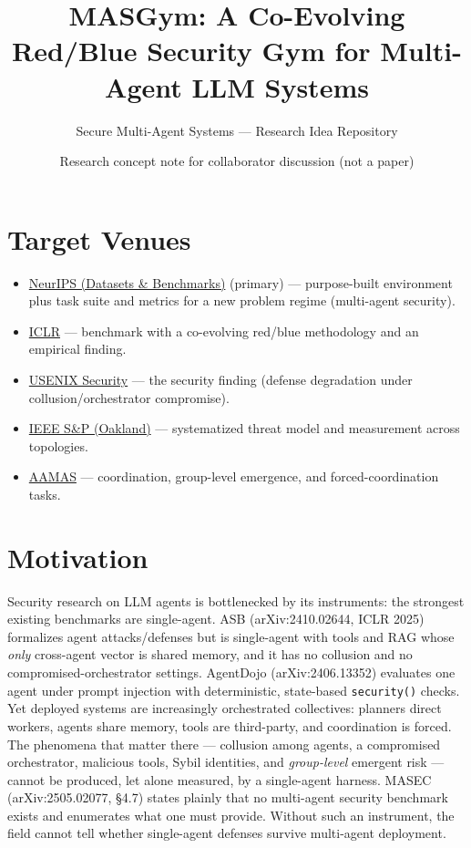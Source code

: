 \documentclass[11pt]{article}
\title{\bfseries MASGym: A Co-Evolving Red/Blue Security Gym for Multi-Agent LLM Systems}
\author{Secure Multi-Agent Systems --- Research Idea Repository}
\date{Research concept note for collaborator discussion (not a paper)}
\begin{document}
\maketitle

\section*{Target Venues}
\begin{itemize}
\item \href{https://neurips.cc/}{NeurIPS (Datasets \& Benchmarks)} (primary) --- purpose-built environment plus task suite and metrics for a new problem regime (multi-agent security).
\item \href{https://iclr.cc/}{ICLR} --- benchmark with a co-evolving red/blue methodology and an empirical finding.
\item \href{https://www.usenix.org/conferences/byname/108}{USENIX Security} --- the security finding (defense degradation under collusion/orchestrator compromise).
\item \href{https://www.ieee-security.org/}{IEEE S\&P (Oakland)} --- systematized threat model and measurement across topologies.
\item \href{https://www.ifaamas.org/}{AAMAS} --- coordination, group-level emergence, and forced-coordination tasks.
\end{itemize}

\section*{Motivation}
Security research on LLM agents is bottlenecked by its instruments: the strongest existing benchmarks are single-agent. ASB (arXiv:2410.02644, ICLR 2025) formalizes agent attacks/defenses but is single-agent with tools and RAG whose \emph{only} cross-agent vector is shared memory, and it has no collusion and no compromised-orchestrator settings. AgentDojo (arXiv:2406.13352) evaluates one agent under prompt injection with deterministic, state-based \texttt{security()} checks. Yet deployed systems are increasingly orchestrated collectives: planners direct workers, agents share memory, tools are third-party, and coordination is forced. The phenomena that matter there --- collusion among agents, a compromised orchestrator, malicious tools, Sybil identities, and \emph{group-level} emergent risk --- cannot be produced, let alone measured, by a single-agent harness. MASEC (arXiv:2505.02077, \S4.7) states plainly that no multi-agent security benchmark exists and enumerates what one must provide. Without such an instrument, the field cannot tell whether single-agent defenses survive multi-agent deployment.
\end{document}
